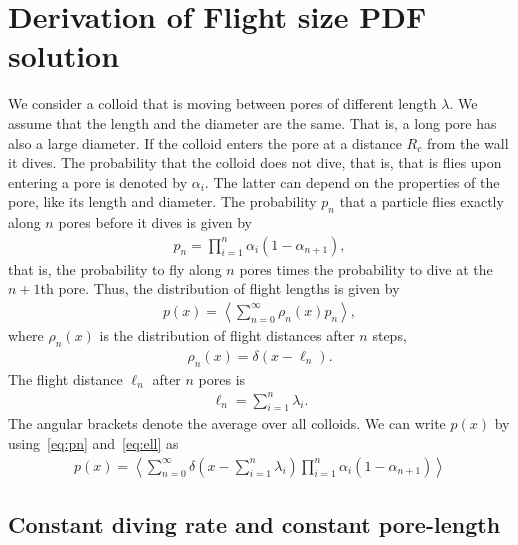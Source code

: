\documentclass[singlecolumn,pre,notitlepage,preprintnumbers,floatfix,superscriptaddress]{revtex4-1}
\begin{document}
\setcounter{section}{0}
\renewcommand{\thesection}{S\arabic{section}}
\section{Derivation of Flight size PDF solution}

We consider a colloid that is moving between pores of different length $\lambda$. We assume that the length and the diameter are the same. That is, a long pore has also a large diameter. If the colloid enters the pore at a distance $R_c$ from the wall it dives. The probability that the colloid does not dive, that is, that is flies upon entering a pore is denoted by $\alpha_i$. The latter can depend on the properties of the pore, like its length and diameter. The probability $p_n$ that a particle flies exactly along $n$ pores before it dives is given by 
%
\begin{align}
\label{eq:pn}
p_n = \prod\limits_{i = 1}^n \alpha_i (1 - \alpha_{n+1}), 
\end{align}
%
that is, the probability to fly along $n$ pores times the probability to dive at the $n+1$th pore. Thus, the distribution of flight lengths is given by
%
\begin{align}
\label{eq:p}
p(x) = \left\langle \sum\limits_{n = 0}^\infty \rho_n(x) p_n \right\rangle, 
\end{align}
%
where $\rho_n(x)$ is the distribution of flight distances after $n$ steps,
%
\begin{align}
\rho_n (x) = \delta(x - \ell_n).
\end{align}
%
The flight distance $\ell_n$ after $n$ pores is
%
\begin{align}
\label{eq:ell}
\ell_n = \sum\limits_{i = 1}^n \lambda_i. 
\end{align}
%
The angular brackets denote the average over all colloids. We can write $p(x)$ by using~\eqref{eq:pn} and~\eqref{eq:ell} as
%
\begin{align}
p(x) = \left\langle \sum\limits_{n = 0}^\infty \delta\left(x - \sum\limits_{i = 1}^n \lambda_i\right) \prod\limits_{i = 1}^n \alpha_i
(1 - \alpha_{n+1}) \right\rangle
\end{align}
%

\subsection{Constant diving rate and constant pore-length}
\end{document}

